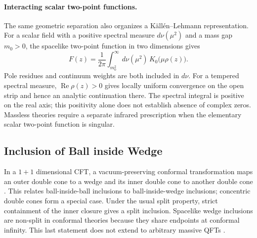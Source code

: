 \documentclass[a4paper,11pt]{article}
\theoremstyle{definition}
\begin{document}
\paragraph{Interacting scalar two-point functions.}
The same geometric separation also organizes a K\"all\'en--Lehmann
representation. For a scalar field with a positive spectral measure $d\nu(\mu^2)$
and a mass gap $m_0>0$, the spacelike two-point function in two dimensions gives
\begin{equation}
 F(z)=\frac{1}{2\pi}\int_{m_0^2}^{\infty}d\nu(\mu^2)\,
 K_0\bigl(\mu\rho(z)\bigr).
 \label{eq:interacting-wedge-spectral}
\end{equation}
Pole residues and continuum weights are both included in $d\nu$.
For a tempered spectral measure, $\operatorname{Re}\rho(z)>0$ gives locally
uniform convergence on the open strip and hence an analytic continuation there.
The spectral integral is positive on the real axis; this positivity alone does
not establish absence of complex zeros. Massless theories require a separate
infrared prescription when the elementary scalar two-point function is singular.

\subsection{Inclusion of Ball inside Wedge}
\label{subsec:ball-inside-wedge}

In a $1+1$ dimensional CFT, a vacuum-preserving conformal transformation maps an outer double cone to a wedge and its inner double cone to another double cone \cite{BrunettiGuidoLongo1993}. This relates ball-inside-ball inclusions to ball-inside-wedge inclusions; concentric double cones form a special case. Under the usual split property, strict containment of the inner closure gives a split inclusion. Spacelike wedge inclusions are non-split in conformal theories because they share endpoints at conformal infinity. This last statement does not extend to arbitrary massive QFTs \cite{Tanimoto2014}.
\end{document}
